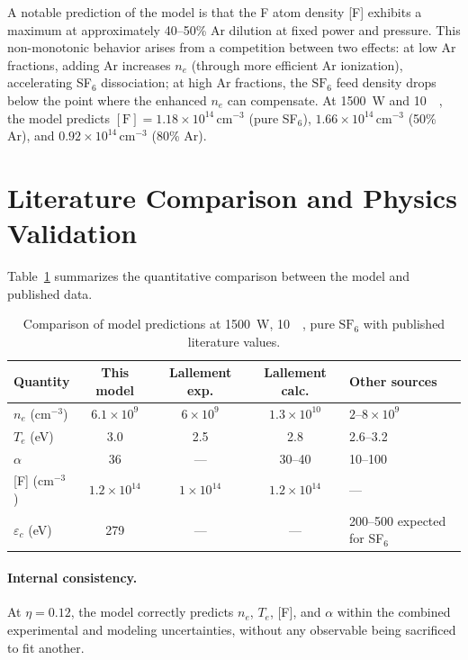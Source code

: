 \documentclass[11pt,a4paper]{report}
\newcommand{\SFsix}{\mathrm{SF}_6}
\newcommand{\Te}{T_e}
\begin{document}
A notable prediction of the model is that the F atom density [F] exhibits a maximum at approximately 40--50\% Ar dilution at fixed power and pressure.  This non-monotonic behavior arises from a competition between two effects: at low Ar fractions, adding Ar increases $n_e$ (through more efficient Ar ionization), accelerating SF$_6$ dissociation; at high Ar fractions, the $\SFsix$ feed density drops below the point where the enhanced $n_e$ can compensate.  At \SI{1500}{\watt} and \SI{10}{\milli\torr}, the model predicts $[\mathrm{F}] = 1.18 \times 10^{14}$\,cm$^{-3}$ (pure SF$_6$), $1.66 \times 10^{14}$\,cm$^{-3}$ (50\% Ar), and $0.92 \times 10^{14}$\,cm$^{-3}$ (80\% Ar).

\section{Literature Comparison and Physics Validation}
\label{sec:gasphase_discussion}

Table~\ref{tab:gas_comparison} summarizes the quantitative comparison between the model and published data.

\begin{table}[H]
\centering
\caption{Comparison of model predictions at \SI{1500}{\watt}, \SI{10}{\milli\torr}, pure $\SFsix$ with published literature values.}
\label{tab:gas_comparison}
\small
\begin{tabular}{lcccl}
\toprule
Quantity & This model & Lallement exp. & Lallement calc. & Other sources \\
\midrule
$n_e$ (cm$^{-3}$) & $6.1 \times 10^9$ & $6 \times 10^9$ & $1.3 \times 10^{10}$ & $2$--$8 \times 10^9$ \cite{Chabert1999} \\
$\Te$ (eV) & 3.0 & 2.5 & 2.8 & 2.6--3.2 \cite{Tuszewski2002} \\
$\alpha$ & 36 & --- & 30--40 & 10--100 \cite{Chabert1999} \\
{[F]} (cm$^{-3}$) & $1.2 \times 10^{14}$ & $1 \times 10^{14}$ & $1.2 \times 10^{14}$ & --- \\
$\varepsilon_c$ (eV) & 279 & --- & --- & 200--500 expected for SF$_6$ \\
\bottomrule
\end{tabular}
\end{table}

\paragraph{Internal consistency.}  At $\eta = 0.12$, the model correctly predicts $n_e$, $\Te$, [F], and $\alpha$ within the combined experimental and modeling uncertainties, without any observable being sacrificed to fit another.
\end{document}
